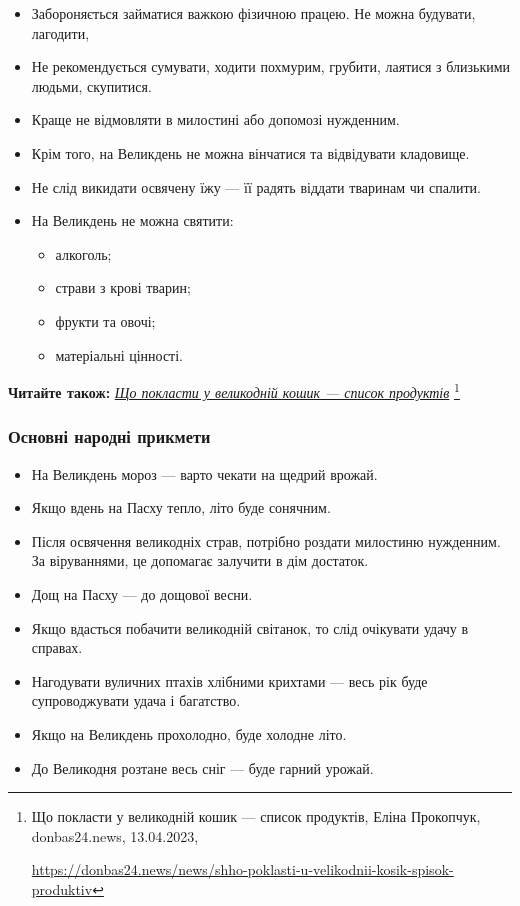 \begin{itemize}
  \item Забороняється займатися важкою фізичною працею. Не можна будувати, лагодити,
  \item Не рекомендується сумувати, ходити похмурим, грубити, лаятися з близькими людьми, скупитися.
  \item Краще не відмовляти в милостині або допомозі нужденним.
  \item Крім того, на Великдень не можна вінчатися та відвідувати кладовище.
  \item Не слід викидати освячену їжу — її радять віддати тваринам чи спалити.
  \item На Великдень не можна святити:
    \begin{itemize}
      \item алкоголь;
      \item страви з крові тварин;
      \item фрукти та овочі;
      \item матеріальні цінності.
    \end{itemize}
\end{itemize}


\textbf{Читайте також:} \href{https://donbas24.news/news/shho-poklasti-u-velikodnii-kosik-spisok-produktiv}{\emph{Що покласти у великодній кошик — список продуктів}}%
\footnote{Що покласти у великодній кошик — список продуктів, Еліна Прокопчук, donbas24.news, 13.04.2023, \par%
\url{https://donbas24.news/news/shho-poklasti-u-velikodnii-kosik-spisok-produktiv}%
}

\subsubsection{Основні народні прикмети}

\begin{itemize}
  \item На Великдень мороз — варто чекати на щедрий врожай.
  \item Якщо вдень на Пасху тепло, літо буде сонячним.
  \item Після освячення великодніх страв, потрібно роздати милостиню нужденним. За віруваннями, це допомагає залучити в дім достаток.
  \item Дощ на Пасху — до дощової весни.
  \item Якщо вдасться побачити великодній світанок, то слід очікувати удачу в справах.
  \item Нагодувати вуличних птахів хлібними крихтами — весь рік буде супроводжувати удача і багатство.
  \item Якщо на Великдень прохолодно, буде холодне літо.
  \item До Великодня розтане весь сніг — буде гарний урожай.
\end{itemize}

